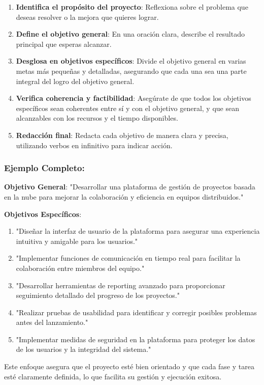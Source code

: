 \begin{enumerate}
    \item \textbf{Identifica el propósito del proyecto}: Reflexiona sobre el problema que deseas resolver o la mejora que quieres lograr.
    \item \textbf{Define el objetivo general}: En una oración clara, describe el resultado principal que esperas alcanzar.
    \item \textbf{Desglosa en objetivos específicos}: Divide el objetivo general en varias metas más pequeñas y detalladas, asegurando que cada una sea una parte integral del logro del objetivo general.
    \item \textbf{Verifica coherencia y factibilidad}: Asegúrate de que todos los objetivos específicos sean coherentes entre sí y con el objetivo general, y que sean alcanzables con los recursos y el tiempo disponibles.
    \item \textbf{Redacción final}: Redacta cada objetivo de manera clara y precisa, utilizando verbos en infinitivo para indicar acción.
\end{enumerate}

\subsubsection{Ejemplo Completo:}

\textbf{Objetivo General}: "Desarrollar una plataforma de gestión de proyectos basada en la nube para mejorar la colaboración y eficiencia en equipos distribuidos."

\textbf{Objetivos Específicos}:

\begin{enumerate}
    \item "Diseñar la interfaz de usuario de la plataforma para asegurar una experiencia intuitiva y amigable para los usuarios."
    \item "Implementar funciones de comunicación en tiempo real para facilitar la colaboración entre miembros del equipo."
    \item "Desarrollar herramientas de reporting avanzado para proporcionar seguimiento detallado del progreso de los proyectos."
    \item "Realizar pruebas de usabilidad para identificar y corregir posibles problemas antes del lanzamiento."
    \item "Implementar medidas de seguridad en la plataforma para proteger los datos de los usuarios y la integridad del sistema."
\end{enumerate}
Este enfoque asegura que el proyecto esté bien orientado y que cada fase y tarea esté claramente definida, lo que facilita su gestión y ejecución exitosa.

 

